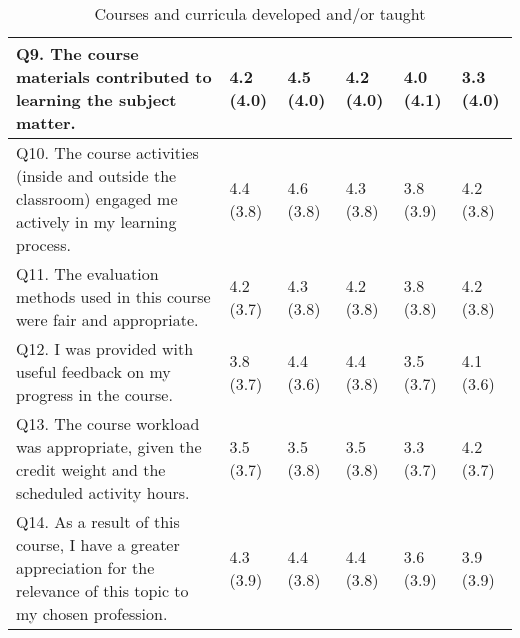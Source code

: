\documentclass[a4paper,11pt]{article}
\begin{document}
\begin{table}[htbp]
\begin{tabular}{@{}p{8cm}p{1.3cm}p{1.3cm}p{1.3cm}p{1.3cm}p{1.3cm}@{}}
Q9. The course materials contributed to learning the subject matter. & 4.2 \newline (4.0)  & 4.5 \newline (4.0) & 
4.2 \newline (4.0)   & 4.0 \newline (4.1) & 3.3 \newline (4.0)  \\ \midrule

Q10. The course activities (inside and outside the classroom) engaged me actively in my learning process. & 4.4 \newline (3.8)  & 4.6 \newline (3.8) & 4.3 \newline (3.8)  & 3.8 \newline (3.9) & 4.2 \newline (3.8)  \\ \midrule

Q11. The evaluation methods used in this course were fair and appropriate. & 4.2 \newline (3.7)  & 4.3 \newline (3.8) & 
4.2 \newline (3.8)  & 3.8 \newline (3.8)  & 4.2 \newline (3.8) \\ \midrule

Q12. I was provided with useful feedback on my progress in the course. & 3.8 \newline (3.7)  & 4.4 \newline (3.6)  & 
4.4 \newline (3.8)  & 3.5 \newline (3.7)  & 4.1 \newline (3.6) \\ \midrule

Q13. The course workload was appropriate, given the credit weight and the scheduled activity hours. & 3.5 \newline (3.7)  & 3.5 \newline (3.8)  & 3.5 \newline (3.8)  & 3.3 \newline (3.7)  & 4.2 \newline (3.7) \\ \midrule

Q14. As a result of this course, I have a greater appreciation for the relevance of this topic to my chosen profession. & 4.3 \newline (3.9)  & 4.4 \newline (3.8)  & 4.4 \newline (3.8)  & 3.6 \newline (3.9)  & 3.9 \newline (3.9)  \\ \midrule

\bottomrule
\end{tabular}
\caption{Courses and curricula developed and/or taught}
\label{tab:courses-taught}
\end{table}
\end{document}
